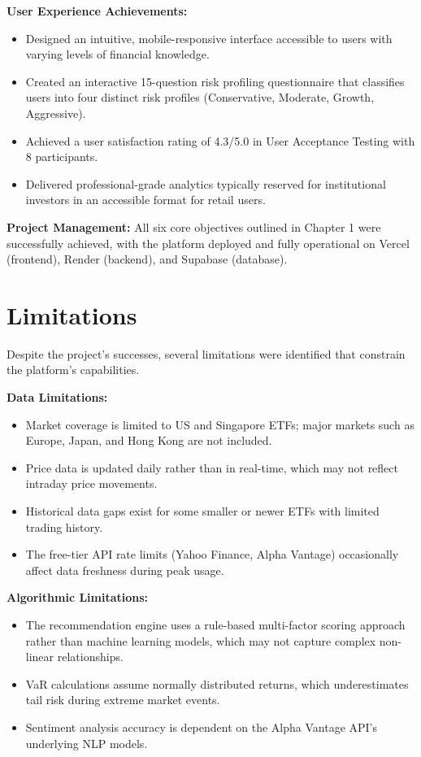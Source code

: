 \textbf{User Experience Achievements:}
\begin{itemize}
    \item Designed an intuitive, mobile-responsive interface accessible to users with varying levels of financial knowledge.
    \item Created an interactive 15-question risk profiling questionnaire that classifies users into four distinct risk profiles (Conservative, Moderate, Growth, Aggressive).
    \item Achieved a user satisfaction rating of 4.3/5.0 in User Acceptance Testing with 8 participants.
    \item Delivered professional-grade analytics typically reserved for institutional investors in an accessible format for retail users.
\end{itemize}

\textbf{Project Management:}
All six core objectives outlined in Chapter 1 were successfully achieved, with the platform deployed and fully operational on Vercel (frontend), Render (backend), and Supabase (database).

\section{Limitations}
\label{sec:limitations}

Despite the project's successes, several limitations were identified that constrain the platform's capabilities.

\textbf{Data Limitations:}
\begin{itemize}
    \item Market coverage is limited to US and Singapore ETFs; major markets such as Europe, Japan, and Hong Kong are not included.
    \item Price data is updated daily rather than in real-time, which may not reflect intraday price movements.
    \item Historical data gaps exist for some smaller or newer ETFs with limited trading history.
    \item The free-tier API rate limits (Yahoo Finance, Alpha Vantage) occasionally affect data freshness during peak usage.
\end{itemize}

\textbf{Algorithmic Limitations:}
\begin{itemize}
    \item The recommendation engine uses a rule-based multi-factor scoring approach rather than machine learning models, which may not capture complex non-linear relationships.
    \item VaR calculations assume normally distributed returns, which underestimates tail risk during extreme market events.
    \item Sentiment analysis accuracy is dependent on the Alpha Vantage API's underlying NLP models.
\end{itemize}

